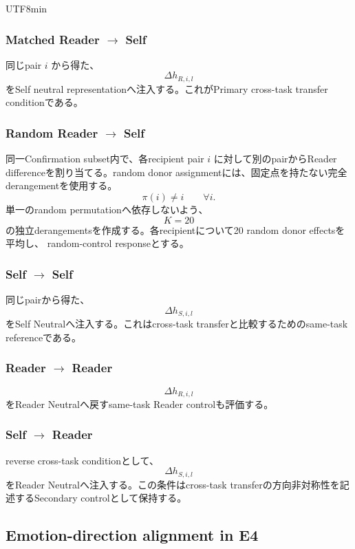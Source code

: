 \documentclass{article} %
\begin{document}
\begin{CJK*}{UTF8}{min}
\subsubsection{Matched Reader \(\rightarrow\) Self}

同じpair \(i\) から得た、
\[
\Delta h_{R,i,l}
\]
をSelf neutral representationへ注入する。これがPrimary cross-task transfer conditionである。


\subsubsection{Random Reader \(\rightarrow\) Self}

同一Confirmation subset内で、各recipient pair \(i\) に対して別のpairからReader differenceを割り当てる。random donor assignmentには、固定点を持たない完全derangementを使用する。
\[
\pi(i)\neq i
\qquad
\forall i.
\]
単一のrandom permutationへ依存しないよう、
\[
K=20
\]
の独立derangementsを作成する。各recipientについて20 random donor effectsを平均し、
random-control responseとする。


\subsubsection{Self \(\rightarrow\) Self}

同じpairから得た、
\[
\Delta h_{S,i,l}
\]
をSelf Neutralへ注入する。これはcross-task transferと比較するためのsame-task referenceである。


\subsubsection{Reader \(\rightarrow\) Reader}

\[
\Delta h_{R,i,l}
\]
をReader Neutralへ戻すsame-task Reader controlも評価する。


\subsubsection{Self \(\rightarrow\) Reader}

reverse cross-task conditionとして、
\[
\Delta h_{S,i,l}
\]
をReader Neutralへ注入する。この条件はcross-task transferの方向非対称性を記述するSecondary controlとして保持する。


\subsection{Emotion-direction alignment in E4}


\end{CJK*}
\end{document}
